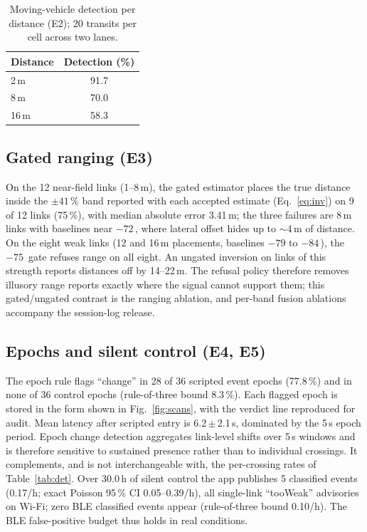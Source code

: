 \documentclass[conference,10pt]{IEEEtran}
\newcommand{\dBm}{\text{dBm}}
\begin{document}
\begin{table}[t]
\centering
\caption{Moving-vehicle detection per distance (E2); 20 transits per cell
across two lanes.}
\label{tab:veh}
\footnotesize
\begin{tabular}{@{}lc@{}}
\toprule
\textbf{Distance} & \textbf{Detection (\%)} \\
\midrule
2\,m  & 91.7 \\
8\,m  & 70.0 \\
16\,m & 58.3 \\
\bottomrule
\end{tabular}
\end{table}

\subsection{Gated ranging (E3)}
On the 12 near-field links (1--8\,m), the gated estimator places the true
distance inside the $\pm41\,\%$ band reported with each accepted estimate
(Eq.~\eqref{eq:inv}) on 9 of 12 links (75\,\%),
with median absolute error 3.41\,m; the three failures are 8\,m links with
baselines near $-72$\,\dBm, where lateral offset hides up to $\sim$4\,m of
distance. On the eight weak links (12 and 16\,m placements, baselines
$-79$ to $-84$\,\dBm), the $-75$\,\dBm{} gate refuses range on all eight.
An ungated inversion on links of this strength reports distances off by
14--22\,m. The refusal policy therefore removes illusory range reports
exactly where the signal cannot support them; this gated/ungated contrast is
the ranging ablation, and per-band fusion ablations accompany the
session-log release.

\subsection{Epochs and silent control (E4, E5)}
The epoch rule flags ``change'' in 28 of 36 scripted event epochs (77.8\,\%)
and in none of 36 control epochs (rule-of-three bound 8.3\,\%). Each
flagged epoch is stored in the form shown in Fig.~\ref{fig:scans}, with the
verdict line reproduced for audit. Mean latency
after scripted entry is 6.2\,$\pm$\,2.1\,s, dominated by the 5\,s epoch
period. Epoch change detection aggregates link-level shifts over 5\,s
windows and is therefore sensitive to sustained presence rather than to
individual crossings. It complements, and is not interchangeable with, the
per-crossing rates of Table~\ref{tab:det}. Over 30.0\,h of silent control
the app publishes 5 classified events (0.17/h; exact Poisson 95\,\% CI
0.05--0.39/h), all single-link ``tooWeak'' advisories on Wi-Fi; zero BLE
classified events appear (rule-of-three bound 0.10/h). The BLE false-positive
budget thus holds in real conditions.
\end{document}
